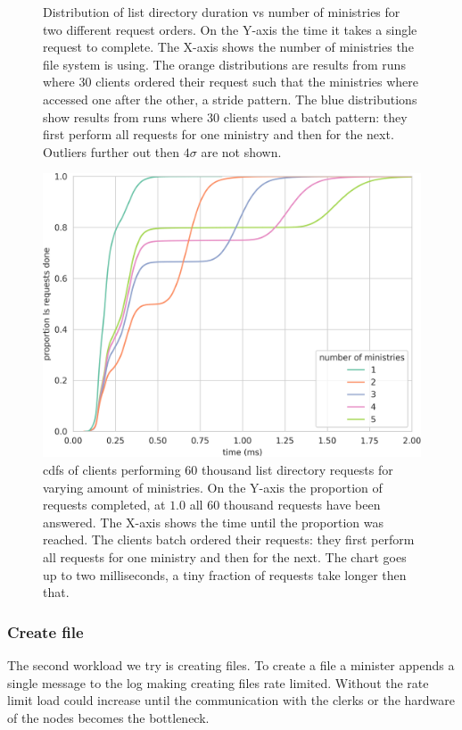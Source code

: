 {\begin{figure}[p]
	\caption{Distribution of list directory duration vs number of ministries for two different request orders. On the Y-axis the time it takes a single request to complete. The X-axis shows the number of ministries the file system is using. The orange distributions are results from runs where $30$ clients ordered their request such that the ministries where accessed one after the other, a stride pattern. The blue distributions show results from runs where $30$ clients used a batch pattern: they first perform all requests for one ministry and then for the next. Outliers further out then $4\sigma$ are not shown.}
	\label{fig:ls_vs_ministries}
\end{figure}
\clearpage
}

\begin{figure}[htb]
	\centering
	\includegraphics[height=\textheight]{../results/plots/ls_batch.png}
	\caption{\acp{cdf} of clients performing 60 thousand list directory requests for varying amount of ministries. On the Y-axis the proportion of requests completed, at $1.0$ all 60 thousand requests have been answered. The X-axis shows the time until the proportion was reached. The clients batch ordered their requests: they first perform all requests for one ministry and then for the next. The chart goes up to two milliseconds, a tiny fraction of requests take longer then that.}
	\label{fig:ls_cdf}
\end{figure}

\clearpage
\subsubsection*{Create file}
The second workload we try is creating files. To create a file a minister appends a single message to the log making creating files rate limited. Without the rate limit load could increase until the communication with the clerks or the hardware of the nodes becomes the bottleneck.%

